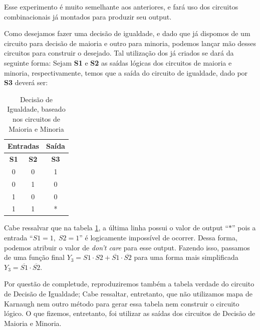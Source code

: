 \documentclass[12pt]{article}
\begin{document}
Esse experimento é muito semelhante aos anteriores, e fará uso dos circuitos
combinacionais já montados para produzir seu output.

Como desejamos fazer uma decisão de igualdade, e dado que já dispomos de um
circuito para decisão de maioria e outro para minoria, podemos lançar mão desses
circuitos para construir o desejado. Tal utilização dos já criados se dará da
seguinte forma: Sejam \textbf{S1} e \textbf{S2} as saídas lógicas dos circuitos
de maioria e minoria, respectivamente, temos que a saída do circuito de
igualdade, dado por \textbf{S3} deverá ser:

\begin{table}[H]
    \centering
    \caption{Decisão de Igualdade, baseado nos circuitos de Maioria e Minoria}
    \begin{tabular}{|c|c|c|}\hline
    \multicolumn{2}{|c|}{Entradas} & \multicolumn{1}{|c|}{Saída} \\\hline
    \textbf{S1} & \textbf{S2} & \textbf{S3} \\\hline
    0 & 0 & 1 \\\hline
    0 & 1 & 0 \\\hline
    1 & 0 & 0 \\\hline
    1 & 1 & * \\\hline
    \end{tabular}\label{tab:decisao_igualdade}
\end{table}

Cabe ressalvar que na tabela \ref{tab:decisao_igualdade}, a última linha possui
o valor de output ``\(*\)'' pois a entrada ``\(S1 = 1, \; S2 = 1\)'' é
logicamente impossível de ocorrer. Dessa forma, podemos atribuir o valor de
\emph{don't care} para esse output. Fazendo isso, passamos de uma função final
\(Y_{3} = S1 \cdot S2 + \overline{S1} \cdot \overline{S2}\) para uma forma mais
simplificada \(Y_{3} = \overline{S1} \cdot \overline{S2} \).

Por questão de completude, reproduziremos também a tabela verdade do circuito de
Decisão de Igualdade; Cabe ressaltar, entretanto, que não utilizamos mapa de
Karnaugh nem outro método para gerar essa tabela nem construir o circuito
lógico. O que fizemos, entretanto, foi utilizar as saídas dos circuitos de
Decisão de Maioria e Minoria.
\end{document}
